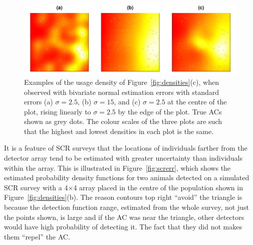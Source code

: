 \documentclass[10pt,a4paper]{article}
\begin{document}
\begin{figure}[htbp]
\centering
\includegraphics[width=\textwidth]{acuseesterr.pdf}
\caption{Examples of the usage density of Figure~\ref{fig:densities}(c), when observed with bivariate normal estimation errors with standard errors (a) $\sigma=2.5$, (b) $\sigma=15$, and (c) $\sigma=2.5$ at the centre of the plot, rising linearly to $\sigma=2.5$ by the edge of the plot. True ACs shown as grey dots. The colour scales of the three plots are such that the highest and lowest densities in each plot is the same.}
\label{fig:acuseesterr}
\end{figure}

It is a feature of SCR surveys that the locations of individuals farther from the detector array tend to be estimated with greater uncertainty than individuals within the array. This is illustrated in Figure~\ref{fig:screrr}, which shows the estimated probability density functions for two animals detected on a simulated SCR survey with a 4$\times$4 array placed in the centre of the population shown in Figure~\ref{fig:densities}(b). The reason contours top right ``avoid'' the triangle is because the detection function range, estimated from the whole survey, not just the points shown, is large and if the AC was near the triangle, other detectors would have high probability of detecting it. The fact that they did not makes them ``repel'' the AC. %
\end{document}
